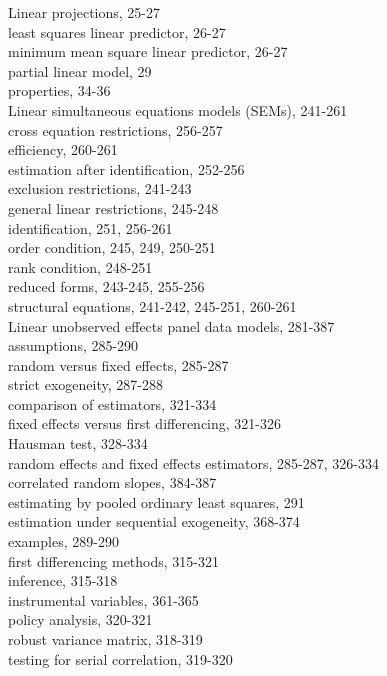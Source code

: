 \documentclass[10pt]{article}
\begin{document}
Linear projections, 25-27\\
least squares linear predictor, 26-27\\
minimum mean square linear predictor, 26-27\\
partial linear model, 29\\
properties, 34-36\\
Linear simultaneous equations models (SEMs), 241-261\\
cross equation restrictions, 256-257\\
efficiency, 260-261\\
estimation after identification, 252-256\\
exclusion restrictions, 241-243\\
general linear restrictions, 245-248\\
identification, 251, 256-261\\
order condition, 245, 249, 250-251\\
rank condition, 248-251\\
reduced forms, 243-245, 255-256\\
structural equations, 241-242, 245-251, 260-261\\
Linear unobserved effects panel data models, 281-387\\
assumptions, 285-290\\
random versus fixed effects, 285-287\\
strict exogeneity, 287-288\\
comparison of estimators, 321-334\\
fixed effects versus first differencing, 321-326\\
Hausman test, 328-334\\
random effects and fixed effects estimators, 285-287, 326-334\\
correlated random slopes, 384-387\\
estimating by pooled ordinary least squares, 291\\
estimation under sequential exogeneity, 368-374\\
examples, 289-290\\
first differencing methods, 315-321\\
inference, 315-318\\
instrumental variables, 361-365\\
policy analysis, 320-321\\
robust variance matrix, 318-319\\
testing for serial correlation, 319-320\\
\end{document}
